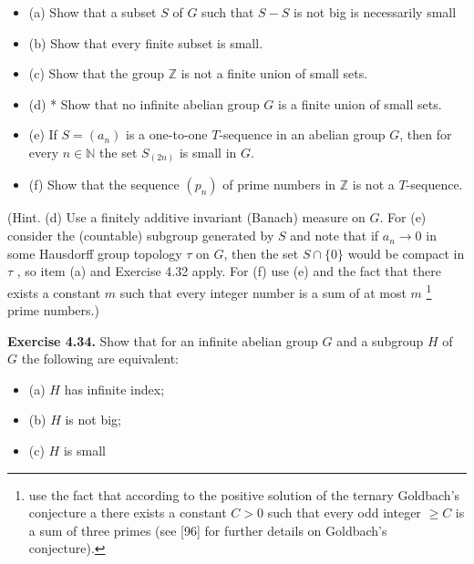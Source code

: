 \documentclass[12pt]{article}
\begin{document}
\begin{itemize}

    \item (a) Show that a subset $S$ of $G$ such that $S - S$ is not big is necessarily small

    \item (b) Show that every finite subset is small.

    \item (c) Show that the group $\mathbb{Z}$ is not a finite union of small sets.

    \item (d) * Show that no infinite abelian group $G$ is a finite union of small sets.

    \item (e) If $S = (a_n)$ is a one-to-one $T$-sequence in an abelian group $G$, then for every $n \in \mathbb{N}$ the set $S_{(2n)}$ is small
    in $G$.

    \item (f) Show that the sequence $(p_n)$ of prime numbers in $\mathbb{Z}$ is not a $T$-sequence.

\end{itemize}


    (Hint. (d) Use a finitely additive invariant (Banach) measure on $G$. For (e) consider the (countable) subgroup
generated by $S$ and note that if $a_n \to 0$ in some Hausdorff group topology $\tau$ on $G$, then the set $S \cap \{0\}$ would
be compact in $\tau$ , so item (a) and Exercise 4.32 apply. For (f) use (e) and the fact that there exists a constant
$m$ such that every integer number is a sum of at most $m$ \footnote[11]{use the fact that according to the positive solution of the ternary Goldbach's conjecture a there exists a constant $C > 0$ such
that every odd integer $\geq C$ is a sum of three primes (see [96] for further details on Goldbach's conjecture).} prime numbers.)


\textbf{Exercise 4.34.} Show that for an infinite abelian group $G$ and a subgroup $H$ of $G$ the following are equivalent:

    \begin{itemize}

        \item (a) $H$ has infinite index;
        
        \item (b) $H$ is not big;
        
        \item (c) $H$ is small

    \end{itemize}
\end{document}
